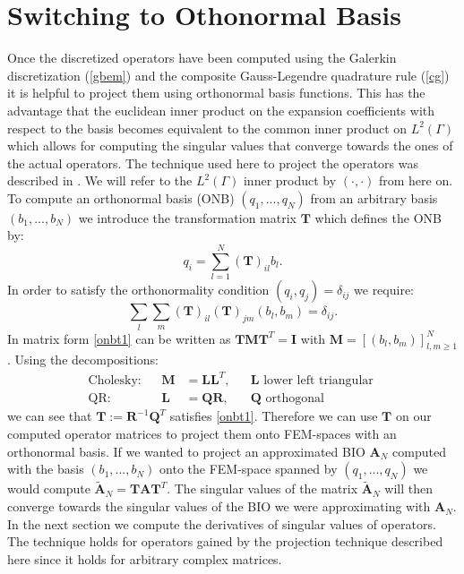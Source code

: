 \documentclass[a4paper, oneside]{thirdparty_stylesheets/discothesis}
\begin{document}
\section{Switching to Othonormal Basis} \label{sec:po}
Once the discretized operators have been computed using the Galerkin discretization (\ref{gbem}) and the composite Gauss-Legendre quadrature rule (\ref{cg}) it is helpful to project them using orthonormal basis functions. 
This has the advantage that the euclidean inner product on the expansion coefficients with respect to the basis becomes equivalent to the common inner product on $L^2(\Gamma)$ which allows for computing the singular values that converge towards the ones of the actual operators.
The technique used here to project the operators was described in \cite{LAN16}.
We will refer to the $L^2(\Gamma)$ inner product by $(\cdot,\cdot)$ from here on.
To compute an orthonormal basis (ONB) $(q_1,...,q_N)$ from an arbitrary basis $(b_1,...,b_N)$ we introduce the transformation matrix $\mathbf{T}$ which defines the ONB by:
\begin{equation}
	q_i  = \sum_{l=1}^N (\mathbf{T})_{il}b_l.	
\end{equation}
In order to satisfy the orthonormality condition $(q_i,q_j) = \delta_{ij}$ we require:
\begin{equation}
	\sum_l\sum_m(\mathbf{T})_{il}(\mathbf{T})_{jm}(b_l,b_m) = \delta_{ij}. \label{onbt1}
\end{equation}
In matrix form \ref{onbt1} can be written as $\mathbf{T}\mathbf{M}\mathbf{T}^T=\mathbf{I}$ with $\mathbf{M}=[(b_l,b_m)]_{l,m\geq1}^N$.
Using the decompositions:
\begin{align}
	\text{Cholesky}:& &\mathbf{M} &= \mathbf{LL}^T,& &\mathbf{L} \text{ lower left triangular }\\
	\text{QR}:& &\mathbf{L} &= \mathbf{QR},& &\mathbf{Q}\text{ orthogonal }
\end{align}
we can see that $\mathbf{T}:= \mathbf{R}^{-1}\mathbf{Q}^T$ satisfies \ref{onbt1}.
Therefore we can use $\mathbf{T}$ on our computed operator matrices to project them onto FEM-spaces with an orthonormal basis.
If we wanted to project an approximated BIO $\mathbf{A}_N$ computed with the basis $(b_1,...,b_N)$ onto the FEM-space spanned by $(q_1,...,q_N)$ we would compute $\mathbf{\tilde{A}}_N=\mathbf{TAT}^T$.
The singular values of the matrix $\mathbf{\tilde{A}}_N$ will then converge towards the singular values of the BIO we were approximating with $\mathbf{A}_N$.
In the next section we compute the derivatives of singular values of operators.
The technique holds for operators gained by the projection technique described here since it holds for arbitrary complex matrices.
\end{document}
